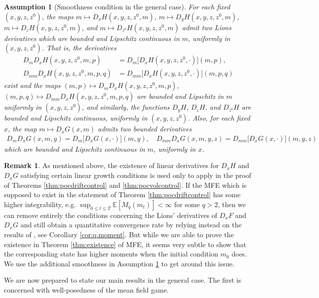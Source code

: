 \documentclass[11pt,reqno]{amsart}
\numberwithin{equation}{section}
\newtheorem{assumption}[theorem]{Assumption}
\theoremstyle{definition}
\newtheorem{remark}[theorem]{Remark}
\def\E{{\mathbb E}}
\newcommand{\sF}{\mathcal{F}}
\def \E{\mathbb{E}}
\begin{document}
\begin{assumption}[Smoothness condition in the general case] \label{assump:cst}
For each fixed $(x,y,z, z^0)$, the maps $m \mapsto D_x H(x,y,z,z^0,m)$, $m \mapsto D_y H(x,y,z,z^0,m)$, $m \mapsto D_z H(x,y,z,z^0,m)$, and $m \mapsto D_{z^0} H(x,y,z,z^0,m)$ admit two Lions derivatives which are bounded and Lipschitz continuous in $m$, uniformly in $(x,y,z,z^0)$. That is, the derivatives
\begin{align*}
D_m D_x H(x,y,z,z^0,m,p) &= D_m\big[D_x H(x,y,z,z^0,\cdot)](m,p), \\
D_{mm} D_x H(x,y,z,z^0,m,p,q) &= D_{mm} \big[D_x H(x,y,z,z^0,\cdot)\big](m,p,q)
\end{align*}
exist and the maps $(m,p) \mapsto D_m D_x H(x,y,z,z^0,m,p)$, $(m,p,q) \mapsto D_{mm} D_x H(x,y,z,z^0,m,p,q)$ are bounded and Lipschitz in $m$ uniformly in $(x,y,z,z^0)$, and similarly, the functions $D_y H$, $D_z H$, and $D_{z^0} H$ are bounded and Lipschitz continuous, uniformly in $(x,y,z,z^0)$.
Also, for each fixed $x$, the map $m \mapsto D_x G(x,m)$ admits two bounded derivatives 
\begin{align*}
D_m D_x G(x,m,y) = D_m\big[D_x G(x,\cdot)](m,y), \quad D_{mm} D_x G(x,m,y,z) = D_{mm} \big[D_x G(x,\cdot)\big](m,y,z)
\end{align*}
which are bounded and Lipschitz continuous in $m$, uniformly in $x$. 
\end{assumption}

\begin{remark}
As mentioned above, the existence of linear derivatives for $D_xH$ and $D_x G$ satisfying certain linear growth conditions is used only to apply \cite[Theorem 2.11]{CST} in the proof of Theorems \ref{thm:pocdriftcontrol} and \ref{thm:pocvolcontrol}. If the MFE which is supposed to exist in the statement of Theorem \ref{thm:pocdriftcontrol} has some higher integrability, e.g. $\sup_{0 \leq t \leq T} \E[M_q(m_t)]<\infty$  for some $q > 2$, then we can remove entirely the conditions concerning the Lions' derivatives of $D_x F$ and $D_x G$ and still obtain a quantitative convergence rate by relying instead on the results of \cite{fournier2015rate}, see Corollary \ref{cor:q.moment}. But while we are able to prove the existence in Theorem  \ref{thm:existence} of MFE, it seems very subtle to show that the corresponding state has higher moments when the initial condition $m_0$ does. We use the additional smoothness in Assumption \ref{assump:cst} to get around this issue.
\end{remark}
We are now prepared to state our main results in the general case. The first is concerned with well-posedness of the mean field game. 
\end{document}
